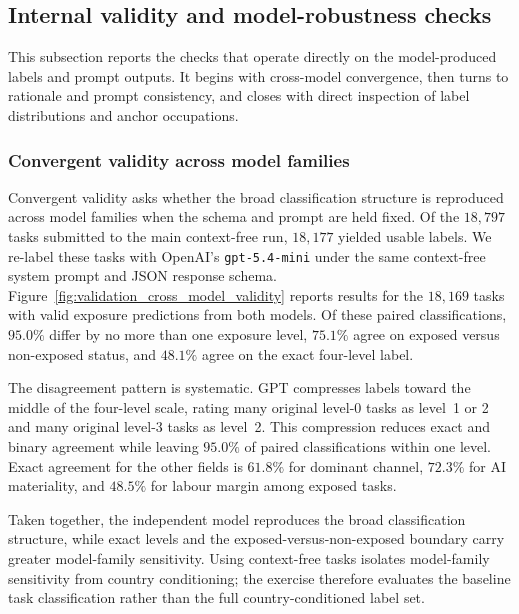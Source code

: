 \documentclass[11pt]{article}
\begin{document}
\FloatBarrier
\subsection{Internal validity and model-robustness checks}
\label{sec:appendix_validation}

\noindent This subsection reports the checks that operate directly on the model-produced labels and prompt outputs. It begins with cross-model convergence, then turns to rationale and prompt consistency, and closes with direct inspection of label distributions and anchor occupations.

\subsubsection{Convergent validity across model families}
\label{sec:validation_convergent}
Convergent validity asks whether the broad classification structure is reproduced across model families when the schema and prompt are held fixed. Of the $18{,}797$ tasks submitted to the main context-free run, $18{,}177$ yielded usable labels. We re-label these tasks with OpenAI's \texttt{gpt-5.4-mini} under the same context-free system prompt and JSON response schema. Figure~\ref{fig:validation_cross_model_validity} reports results for the $18{,}169$ tasks with valid exposure predictions from both models. Of these paired classifications, $95.0\%$ differ by no more than one exposure level, $75.1\%$ agree on exposed versus non-exposed status, and $48.1\%$ agree on the exact four-level label.

The disagreement pattern is systematic. GPT compresses labels toward the middle of the four-level scale, rating many original level-0 tasks as level~1 or 2 and many original level-3 tasks as level~2. This compression reduces exact and binary agreement while leaving $95.0\%$ of paired classifications within one level. Exact agreement for the other fields is $61.8\%$ for dominant channel, $72.3\%$ for AI materiality, and $48.5\%$ for labour margin among exposed tasks.

Taken together, the independent model reproduces the broad classification structure, while exact levels and the exposed-versus-non-exposed boundary carry greater model-family sensitivity. Using context-free tasks isolates model-family sensitivity from country conditioning; the exercise therefore evaluates the baseline task classification rather than the full country-conditioned label set.
\end{document}
